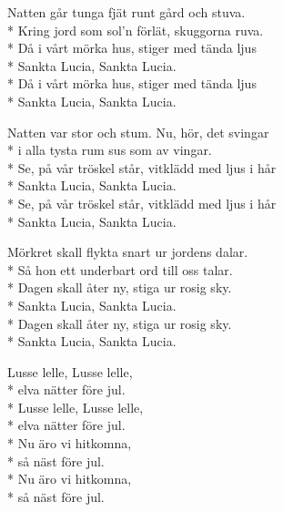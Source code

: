 \pagestyle{Julvisor}
\begin{SongText}
    \begin{SongVerse}
        Natten går tunga fjät runt gård och stuva.\\*%
        Kring jord som sol'n förlät, skuggorna ruva.\\*%
        Då i vårt mörka hus, stiger med tända ljus\\*%
        Sankta Lucia, Sankta Lucia.\\*%
        Då i vårt mörka hus, stiger med tända ljus\\*%
        Sankta Lucia, Sankta Lucia.
    \end{SongVerse}
    \begin{SongVerse}
        Natten var stor och stum. Nu, hör, det svingar\\*%
        i alla tysta rum sus som av vingar.\\*%
        Se, på vår tröskel står, vitklädd med ljus i hår\\*%
        Sankta Lucia, Sankta Lucia.\\*%
        Se, på vår tröskel står, vitklädd med ljus i hår\\*%
        Sankta Lucia, Sankta Lucia.
    \end{SongVerse}
    \begin{SongVerse}
        Mörkret skall flykta snart ur jordens dalar.\\*%
        Så hon ett underbart ord till oss talar.\\*%
        Dagen skall åter ny, stiga ur rosig sky.\\*%
        Sankta Lucia, Sankta Lucia.\\*%
        Dagen skall åter ny, stiga ur rosig sky.\\*%
        Sankta Lucia, Sankta Lucia.
    \end{SongVerse}
    \begin{SongVerse}
    \end{SongVerse}
\end{SongText}
\begin{SongText}
    \begin{SongVerse}
        Lusse lelle, Lusse lelle,\\*%
        elva nätter före jul.\\*%
        Lusse lelle, Lusse lelle,\\*%
        elva nätter före jul.\\*%
        Nu äro vi hitkomna,\\*%
        så näst före jul.\\*%
        Nu äro vi hitkomna,\\*%
        så näst före jul.
    \end{SongVerse}
\end{SongText}
